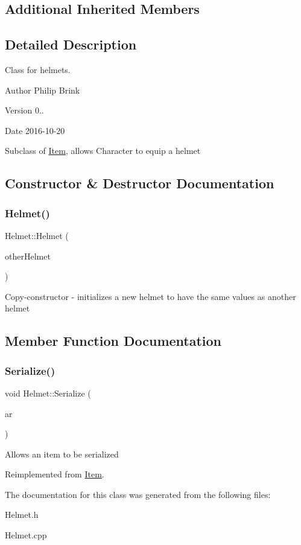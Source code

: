 \subsection*{Additional Inherited Members}


\subsection{Detailed Description}
Class for helmets. 

\begin{DoxyAuthor}{Author}
Philip Brink 
\end{DoxyAuthor}
\begin{DoxyVersion}{Version}
0.. 
\end{DoxyVersion}
\begin{DoxyDate}{Date}
2016-\/10-\/20
\end{DoxyDate}
Subclass of \hyperlink{class_item}{Item}, allows Character to equip a helmet 

\subsection{Constructor \& Destructor Documentation}
\hypertarget{class_helmet_a27eceb089c04d2dcab69d49d30d7b92c}{}\label{class_helmet_a27eceb089c04d2dcab69d49d30d7b92c} 
\subsubsection{\texorpdfstring{Helmet()}{Helmet()}}
{\footnotesize\ttfamily Helmet\+::\+Helmet (\begin{DoxyParamCaption}\item[{const \hyperlink{class_helmet}{Helmet} $\ast$}]{other\+Helmet }\end{DoxyParamCaption})}

Copy-\/constructor -\/ initializes a new helmet to have the same values as another helmet 

\subsection{Member Function Documentation}
\hypertarget{class_helmet_abb01d02590723236e9cf9e260824e712}{}\label{class_helmet_abb01d02590723236e9cf9e260824e712} 
\subsubsection{\texorpdfstring{Serialize()}{Serialize()}}
{\footnotesize\ttfamily void Helmet\+::\+Serialize (\begin{DoxyParamCaption}\item[{C\+Archive \&}]{ar }\end{DoxyParamCaption})\hspace{0.3cm}{\ttfamily [virtual]}}

Allows an item to be serialized 

Reimplemented from \hyperlink{class_item_ad1eae21e57fc3ce3252080a4efbfb8e8}{Item}.



The documentation for this class was generated from the following files\+:\begin{DoxyCompactItemize}
\item 
Helmet.\+h\item 
Helmet.\+cpp\end{DoxyCompactItemize}

